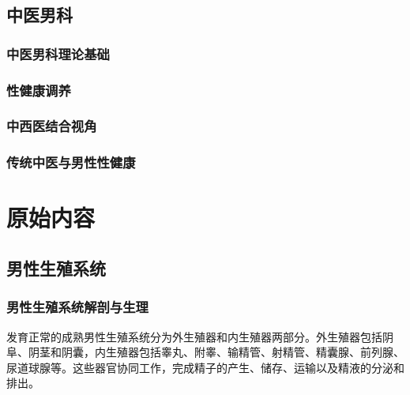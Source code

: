 \chapter{中医男科}

\section{中医男科理论基础}

\section{性健康调养}

\section{中西医结合视角}

\section{传统中医与男性性健康}


\part*{原始内容}


\chapter{男性生殖系统}

\section{男性生殖系统解剖与生理}

发育正常的成熟男性生殖系统分为外生殖器和内生殖器两部分。外生殖器包括阴阜、阴茎和阴囊，内生殖器包括睾丸、附睾、输精管、射精管、精囊腺、前列腺、尿道球腺等。这些器官协同工作，完成精子的产生、储存、运输以及精液的分泌和排出。

